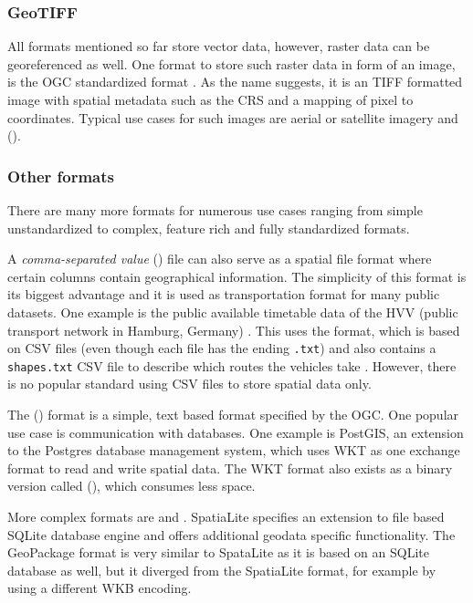 		\subsubsection{GeoTIFF}
		
			All formats mentioned so far store vector data, however, raster data can be georeferenced as well.
			One format to store such raster data in form of an image, is the OGC standardized  format \cite{ogc-geotiff}.
			As the name suggests, it is an TIFF formatted image with spatial metadata such as the CRS and a mapping of pixel to coordinates.
			Typical use cases for such images are aerial or satellite imagery and  ().
		
		\subsubsection{Other formats}
		
			There are many more formats for numerous use cases ranging from simple unstandardized to complex, feature rich and fully standardized formats.
			
			A \emph{comma-separated value} () file can also serve as a spatial file format where certain columns contain geographical information.
			The simplicity of this format is its biggest advantage and it is used as transportation format for many public datasets.
			One example is the public available timetable data of the HVV (public transport network in Hamburg, Germany) \cite{hvv-fahrplandaten}.
			This uses the  format, which is based on CSV files (even though each file has the ending \texttt{.txt}) and also contains a \texttt{shapes.txt} CSV file to describe which routes the vehicles take \cite{google-gtfs}.
			However, there is no popular standard using CSV files to store spatial data only.
			
			The  () format is a simple, text based format specified by the OGC\cite[51]{ogc-sfa}.
			One popular use case is communication with databases.
			One example is PostGIS, an extension to the Postgres database management system, which uses WKT as one exchange format to read and write spatial data\cite{postgis-doc-wkt}.
			The WKT format also exists as a binary version called  (), which consumes less space.
			
			More complex formats are  and .
			SpatiaLite specifies an extension to file based SQLite database engine and offers additional geodata specific functionality\cite{spatialite-website}.
			The GeoPackage format is very similar to SpataLite as it is based on an SQLite database as well, but it diverged from the SpatiaLite format, for example by using a different WKB encoding\cite{geopackage-faq}.
			
